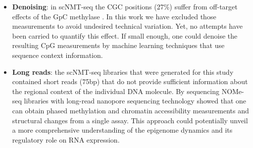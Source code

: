 \begin{itemize}
	\item \textbf{Denoising}: in scNMT-seq the CGC positions (27\%) suffer from off-target effects of the GpC methylase \cite{Kelly2012}. In this work we have excluded those measurements to avoid undesired technical variation. Yet, no attempts have been carried to quantify this effect. If small enough, one could denoise the resulting CpG measurements by machine learning techniques that use sequence context information.


	\item \textbf{Long reads}: the scNMT-seq libraries that were generated for this study contained short reads (75bp) that do not provide sufficient information about the regional context of the individual DNA molecule. By sequencing NOMe-seq libraries with long-read nanopore sequencing technology \cite{Lee2018} showed that one can obtain phased methylation and chromatin accessibility measurements and structural changes from a single assay. This approach could potentially unveil a more comprehensive understanding of the epigenome dynamics and its regulatory role on RNA expression.

\end{itemize}



